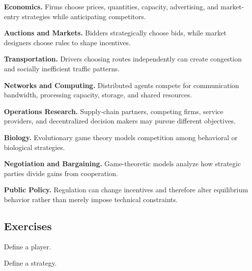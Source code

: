 \begin{applicationbox}

\textbf{Economics.}
Firms choose prices, quantities, capacity, advertising, and market-entry
strategies while anticipating competitors.

\medskip

\textbf{Auctions and Markets.}
Bidders strategically choose bids, while market designers choose rules to
shape incentives.

\medskip

\textbf{Transportation.}
Drivers choosing routes independently can create congestion and socially
inefficient traffic patterns.

\medskip

\textbf{Networks and Computing.}
Distributed agents compete for communication bandwidth, processing
capacity, storage, and shared resources.

\medskip

\textbf{Operations Research.}
Supply-chain partners, competing firms, service providers, and decentralized
decision makers may pursue different objectives.

\medskip

\textbf{Biology.}
Evolutionary game theory models competition among behavioral or biological
strategies.

\medskip

\textbf{Negotiation and Bargaining.}
Game-theoretic models analyze how strategic parties divide gains from
cooperation.

\medskip

\textbf{Public Policy.}
Regulation can change incentives and therefore alter equilibrium behavior
rather than merely impose technical constraints.

\end{applicationbox}

\subsection{Exercises}
\label{subsec:game-theory-exercises}

\begin{exercise}[1]
Define a player.
\end{exercise}

\begin{exercise}[1]
Define a strategy.
\end{exercise}

